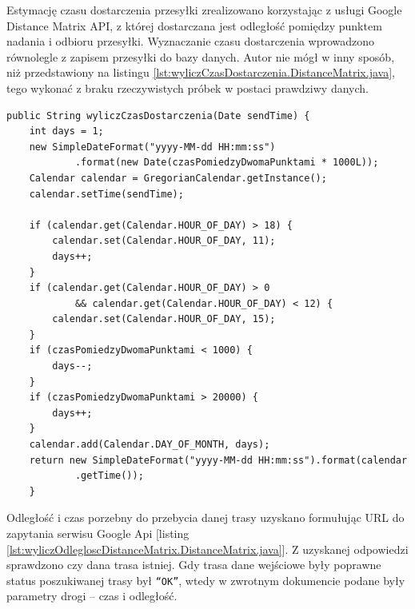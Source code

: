 \documentclass[eng,printmode,oneside]{mgr}
\begin{document}
Estymację czasu dostarczenia przesyłki zrealizowano korzystając z usługi Google
Distance Matrix API, z której dostarczana jest odległość pomiędzy punktem
nadania i odbioru przesyłki. Wyznaczanie czasu dostarczenia wprowadzono
równolegle z zapisem przesyłki do bazy danych. Autor nie mógł w inny sposób, niż
przedstawiony na listingu \ref{lst:wyliczCzasDostarczenia.DistanceMatrix.java},
tego wykonać z braku rzeczywistych próbek w postaci prawdziwy danych. 

\begin{lstlisting}[caption=Metoda
wyliczCzasDostarczenia() z
klasy DistanceMatrix,label=lst:wyliczCzasDostarczenia.DistanceMatrix.java]
public String wyliczCzasDostarczenia(Date sendTime) { 
	int days = 1;
	new SimpleDateFormat("yyyy-MM-dd HH:mm:ss")
			.format(new Date(czasPomiedzyDwomaPunktami * 1000L));
	Calendar calendar = GregorianCalendar.getInstance();
	calendar.setTime(sendTime);
	
	if (calendar.get(Calendar.HOUR_OF_DAY) > 18) {
		calendar.set(Calendar.HOUR_OF_DAY, 11);
		days++;
	}
	if (calendar.get(Calendar.HOUR_OF_DAY) > 0
			&& calendar.get(Calendar.HOUR_OF_DAY) < 12) {
		calendar.set(Calendar.HOUR_OF_DAY, 15);
	}
	if (czasPomiedzyDwomaPunktami < 1000) {
		days--;
	}
	if (czasPomiedzyDwomaPunktami > 20000) {
		days++;
	}
	calendar.add(Calendar.DAY_OF_MONTH, days);
	return new SimpleDateFormat("yyyy-MM-dd HH:mm:ss").format(calendar
			.getTime());
	}
\end{lstlisting}

Odległość i czas porzebny do przebycia danej trasy uzyskano
formułując URL do zapytania serwisu Google Api [listing
\ref{lst:wyliczOdlegloscDistanceMatrix.DistanceMatrix.java}]. Z
uzyskanej odpowiedzi sprawdzono czy dana trasa istniej. Gdy trasa dane wejściowe
były poprawne status poszukiwanej trasy był \texttt{``OK''}, wtedy w zwrotnym
dokumencie podane były parametry drogi -- czas i odległość.
\end{document}

